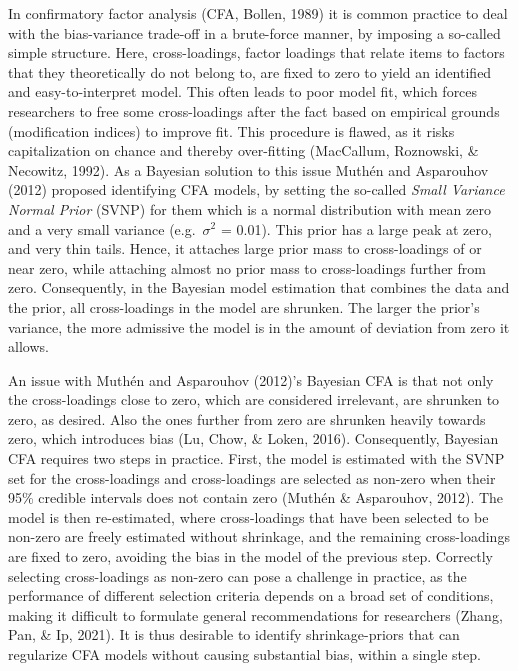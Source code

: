 \documentclass[
  english,
  man, donotrepeattitle,floatsintext]{apa6}
\begin{document}
In confirmatory factor analysis (CFA, Bollen, 1989) it is common practice to deal with the bias-variance trade-off in a brute-force manner, by imposing a so-called simple structure. Here, cross-loadings, factor loadings that relate items to factors that they
theoretically do not belong to, are fixed to zero to yield an identified and easy-to-interpret model. This often leads to poor model fit, which forces researchers to free some cross-loadings after the fact based on empirical grounds (modification indices) to improve fit. This procedure is flawed, as it risks capitalization on chance and thereby over-fitting (MacCallum, Roznowski, \& Necowitz, 1992). As a Bayesian solution to this issue Muthén and Asparouhov (2012) proposed identifying CFA models, by setting the so-called \emph{Small Variance Normal Prior} (SVNP) for them which is a normal distribution with mean zero and a very small variance (e.g.~\(\sigma^2\) = 0.01). This prior has a large peak at zero, and very thin tails. Hence, it attaches large prior mass to cross-loadings of or near zero, while attaching almost no prior mass to cross-loadings further from zero. Consequently, in the Bayesian model estimation that combines the data and the prior, all cross-loadings in the model are shrunken. The larger the prior's variance, the more admissive the model is in the amount of deviation from zero it allows.

An issue with Muthén and Asparouhov (2012)'s Bayesian CFA is that not only the cross-loadings close to zero, which are considered irrelevant, are shrunken to zero, as desired. Also the ones further from zero are shrunken heavily towards zero, which introduces bias (Lu, Chow, \& Loken, 2016). Consequently, Bayesian CFA requires two steps in practice. First, the model is estimated with the SVNP set for the cross-loadings and cross-loadings are selected as non-zero when their 95\% credible intervals does not contain zero (Muthén \& Asparouhov, 2012). The model is then re-estimated, where cross-loadings that have been selected to be non-zero are freely estimated without shrinkage, and the remaining cross-loadings are fixed to zero, avoiding the bias in the model of the previous step. Correctly selecting cross-loadings as non-zero can pose a challenge in practice, as the performance of different selection criteria depends on a broad set of conditions, making it difficult to formulate general recommendations for researchers (Zhang, Pan, \& Ip, 2021). It is thus desirable to identify shrinkage-priors that can regularize CFA models without causing substantial bias, within a single step.
\end{document}
